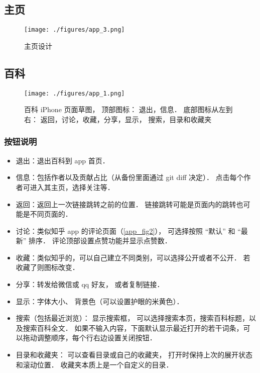 
\begin{issues}
\issueDraft
\end{issues}

\subsection{主页}

\begin{figure}[ht]
\centering
\texttt{[image: ./figures/app\_3.png]}
\caption{主页设计} \label{app_fig3}
\end{figure}

\subsection{百科}
\begin{figure}[ht]
\centering
\texttt{[image: ./figures/app\_1.png]}
\caption{百科 iPhone 页面草图， 顶部图标： 退出，信息． 底部图标从左到右： 返回，讨论，收藏，分享，显示， 搜索，目录和收藏夹}\label{app_fig1}
\end{figure}

\subsubsection{按钮说明}
\begin{itemize}
\item 退出：退出百科到 app 首页．
\item 信息：包括作者以及贡献占比（从备份里面通过 git diff 决定）． 点击每个作者可进入其主页，选择关注等．
\item 返回：返回上一次链接跳转之前的位置． 链接跳转可能是页面内的跳转也可能是不同页面的．
\item 讨论：类似知乎 app 的评论页面（\autoref{app_fig2}）， 可选择按照 “默认” 和 “最新” 排序． 评论顶部设置点赞功能并显示点赞数．
\item 收藏：类似知乎的，可以自己建立不同类别，可以选择公开或者不公开． 若收藏了则图标改变．
\item 分享：转发给微信或 qq 好友， 或者复制链接．
\item 显示：字体大小、 背景色（可以设置护眼的米黄色）．
\item 搜索（包括最近浏览）： 显示搜索框， 可以选择搜索本页，搜索百科标题，以及搜索百科全文． 如果不输入内容，下面默认显示最近打开的若干词条，可以拖动调整顺序，每个行右边设置关闭按钮．
\item 目录和收藏夹： 可以查看目录或自己的收藏夹， 打开时保持上次的展开状态和滚动位置． 收藏夹本质上是一个自定义的目录．
\end{itemize}

